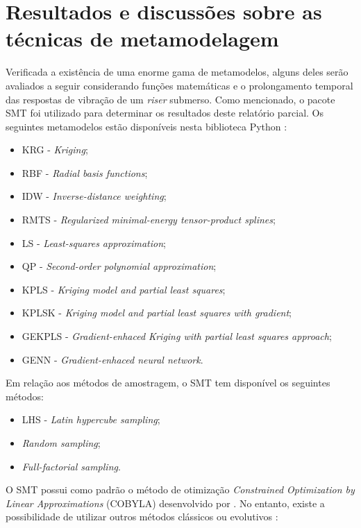 \chapter{Resultados e discussões sobre as técnicas de metamodelagem}\label{chap_aplicacao}

Verificada a existência de uma enorme gama de metamodelos, alguns deles serão avaliados a seguir considerando funções matemáticas e o prolongamento temporal das respostas de vibração de um \textit{riser} submerso. Como mencionado, o pacote SMT foi utilizado para determinar os resultados deste relatório parcial. Os seguintes metamodelos estão disponíveis nesta biblioteca Python \cite{BOUHLEL2019}:

	\begin{itemize}
	\item KRG - \textit{Kriging};
	\item RBF - \textit{Radial basis functions};
	\item IDW - \textit{Inverse-distance weighting};
	\item RMTS - \textit{Regularized minimal-energy tensor-product splines};
	\item LS - \textit{Least-squares approximation};
	\item QP - \textit{Second-order polynomial approximation};
	\item KPLS - \textit{Kriging model and partial least squares}; 
	\item KPLSK - \textit{Kriging model and partial least squares with gradient}; 
	\item GEKPLS - \textit{Gradient-enhaced Kriging with partial least squares approach};
	\item GENN - \textit{Gradient-enhaced neural network}.
	
\end{itemize}

Em relação aos métodos de amostragem, o SMT tem disponível os seguintes métodos:

\begin{itemize}
\item LHS - \textit{Latin hypercube sampling};
\item \textit{Random sampling};
\item \textit{Full-factorial sampling}.
\end{itemize}

O SMT possui como padrão o método de otimização \textit{Constrained Optimization by Linear Approximations} (COBYLA) desenvolvido por . No entanto, existe a possibilidade de utilizar outros métodos clássicos ou evolutivos \cite{scipy}:


